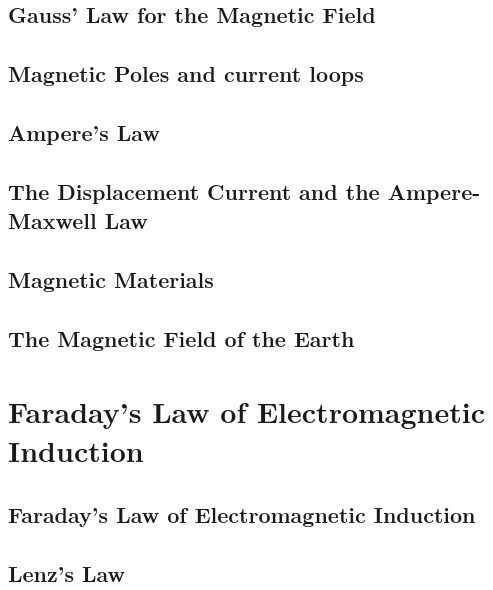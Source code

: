 \documentclass{article}
\begin{document}
\subsection{Gauss' Law for the Magnetic Field}
\begin{outline}
	\1 
\end{outline}
\subsection{Magnetic Poles and current loops}
\begin{outline}
	\1 
\end{outline}
\subsection{Ampere's Law}
\begin{outline}
	\1 
\end{outline}
\subsection{The Displacement Current and the Ampere-Maxwell Law}
\begin{outline}
	\1 
\end{outline}
\subsection{Magnetic Materials}
\begin{outline}
	\1 
\end{outline}
\subsection{The Magnetic Field of the Earth}
\begin{outline}
	\1 
\end{outline}
\section{Faraday's Law of Electromagnetic Induction}
\subsection{Faraday's Law of Electromagnetic Induction}
\begin{outline}
	\1 
\end{outline}
\subsection{Lenz's Law}
\begin{outline}
	\1 
\end{outline}
\end{document}
